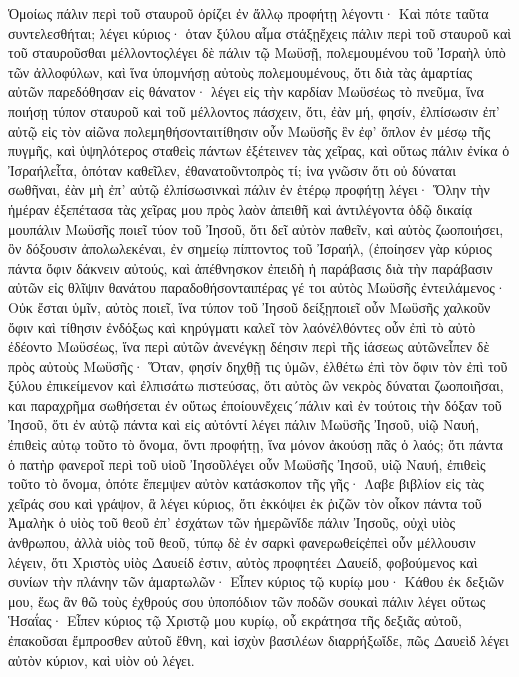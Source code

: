 Ὁμοίως πάλιν περὶ τοῦ σταυροῦ ὁρίζει ἐν ἄλλῳ προφήτῃ λέγοντι· Καὶ πότε ταῦτα συντελεσθήται; λέγει κύριος· ὁταν ξύλου αἷμα στάξῃἔχεις πάλιν περὶ τοῦ σταυροῦ καὶ τοῦ σταυροῦσθαι μέλλοντοςλέγει δὲ πάλιν τῷ Μωϋσῇ, πολεμουμένου τοῦ Ἰσραὴλ ὑπὸ τῶν ἀλλοφύλων, καὶ ἵνα ὑπομνήσῃ αὐτοὺς πολεμουμένους, ὅτι διὰ τὰς ἁμαρτίας αὐτῶν παρεδόθησαν εἰς θάνατον· λέγει εἰς τὴν καρδίαν Μωϋσέως τὸ πνεῦμα, ἵνα ποιήσῃ τύπον σταυροῦ καὶ τοῦ μέλλοντος πάσχειν, ὅτι, ἐὰν μή, φησίν, ἐλπίσωσιν ἐπ’ αὐτῷ εἰς τὸν αἰῶνα πολεμηθήσονταιτίθησιν οὖν Μωϋσῆς ἓν ἐφ’ ὅπλον ἐν μέσῳ τῆς πυγμῆς, καὶ ὑψηλότερος σταθεὶς πάντων ἐξέτεινεν τὰς χεῖρας, καὶ οὕτως πάλιν ἐνίκα ὁ Ἰσραήλεἶτα, ὁπόταν καθεῖλεν, ἐθανατοῦντοπρὸς τί; ἱνα γνῶσιν ὅτι οὐ δύναται σωθῆναι, ἐὰν μὴ ἐπ’ αὐτῷ ἐλπίσωσινκαὶ πάλιν ἐν ἑτέρῳ προφήτῃ λέγει· Ὅλην τὴν ἡμέραν ἐξεπέτασα τὰς χεῖρας μου πρὸς λαὸν ἀπειθῆ καὶ ἀντιλέγοντα ὁδῷ δικαίᾳ μουπάλιν Μωϋσῆς ποιεῖ τύον τοῦ Ἰησοῦ, ὅτι δεῖ αὐτὸν παθεῖν, καὶ αὐτὸς ζωοποιήσει, ὃν δόξουσιν ἀπολωλεκέναι, ἐν σημείῳ πίπτοντος τοῦ Ἰσραήλ, (ἐποίησεν γὰρ κύριος πάντα ὄφιν δάκνειν αὐτούς, καὶ ἀπέθνησκον ἐπειδὴ ἡ παράβασις διὰ τὴν παράβασιν αὐτῶν εἰς θλῖψιν θανάτου παραδοθήσονταιπέρας γέ τοι αὐτὸς Μωϋσῆς ἐντειλάμενος· Οὐκ ἔσται ὑμῖν, αὐτὸς ποιεῖ, ἵνα τύπον τοῦ Ἰησοῦ δείξῃποιεῖ οὖν Μωϋσῆς χαλκοῦν ὄφιν καὶ τίθησιν ἐνδόξως καὶ κηρύγματι καλεῖ τὸν λαόνἐλθόντες οὖν ἐπὶ τὸ αὐτὸ ἐδέοντο Μωϋσέως, ἵνα περὶ αὐτῶν ἀνενέγκῃ δέησιν περὶ τῆς ἰάσεως αὐτῶνεἶπεν δὲ πρὸς αὐτοὺς Μωϋσῆς· Ὅταν, φησίν δηχθῇ τις ὑμῶν, ἐλθέτω ἐπὶ τὸν ὄφιν τὸν ἐπὶ τοῦ ξύλου ἐπικείμενον καὶ ἐλπισάτω πιστεύσας, ὅτι αὐτὸς ὢν νεκρὸς δύναται ζωοποιῆσαι, και παραχρῆμα σωθήσεται ἐν οὕτως ἐποίουνἔχεις´πάλιν καὶ ἐν τούτοις τὴν δόξαν τοῦ Ἰησοῦ, ὅτι ἐν αὑτῷ πάντα καὶ εἰς αὐτόντί λέγει πάλιν Μωϋσῆς Ἰησοῦ, υἱῷ Ναυή, ἐπιθεὶς αὐτῳ τοῦτο τὸ ὄνομα, ὄντι προφήτῃ, ἵνα μόνον ἀκούσῃ πᾶς ὁ λαός; ὅτι πάντα ὁ πατὴρ φανεροῖ περὶ τοῦ υἱοῦ Ἰησοῦλέγει οὖν Μωϋσῆς Ἰησοῦ, υἱῷ Ναυή, ἐπιθεὶς τοῦτο τὸ ὄνομα, ὁπότε ἔπεμψεν αὐτὸν κατάσκοπον τῆς γῆς· Λαβε βιβλίον εἰς τὰς χεῖράς σου καὶ γράψον, ἃ λέγει κύριος, ὅτι ἐκκόψει ἐκ ῥιζῶν τὸν οἶκον πάντα τοῦ Ἀμαλὴκ ὁ υἱὸς τοῦ θεοῦ ἐπ’ ἐσχάτων τῶν ἡμερῶνἴδε πάλιν Ἰησοῦς, οὐχὶ υἱὸς ἀνθρωπου, ἀλλὰ υἱὸς τοῦ θεοῦ, τύπῳ δὲ ἐν σαρκὶ φανερωθείςἐπεὶ οὖν μέλλουσιν λέγειν, ὅτι Χριστὸς υἱὸς Δαυείδ ἐστιν, αὐτὸς προφητέει Δαυείδ, φοβούμενος καὶ συνίων τὴν πλάνην τῶν ἁμαρτωλῶν· Εἶπεν κύριος τῷ κυρίῳ μου· Κάθου ἐκ δεξιῶν μου, ἕως ἂν θῶ τοὺς ἐχθρούς σου ὑποπόδιον τῶν ποδῶν σουκαὶ πάλιν λέγει οὕτως Ἡσαΐας· Εἶπεν κύριος τῷ Χριστῷ μου κυρίῳ, οὗ εκράτησα τῆς δεξιᾶς αὐτοῦ, ἐπακοῦσαι ἔμπροσθεν αὐτοῦ ἔθνη, καὶ ἰσχὺν βασιλέων διαρρήξωἴδε, πῶς Δαυεὶδ λέγει αὐτὸν κύριον, καὶ υἱὸν οὐ λέγει.

